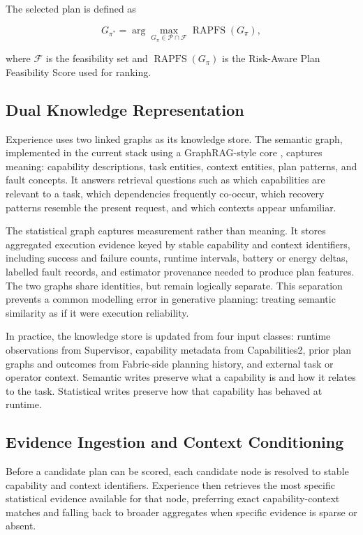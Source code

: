 \documentclass[letterpaper, 10pt, conference]{ieeeconf}
\begin{document}
The selected plan is defined as

\begin{equation}
G_{\pi^*}=\arg\max_{G_{\pi}\in \mathcal{P}\cap \mathcal{F}} \operatorname{RAPFS}(G_{\pi}),
\end{equation}

where $\mathcal{F}$ is the feasibility set and $\operatorname{RAPFS}(G_{\pi})$ is the Risk-Aware Plan Feasibility Score used for ranking.

\subsection{Dual Knowledge Representation}

Experience uses two linked graphs as its knowledge store. The semantic graph, implemented in the current stack using a GraphRAG-style core \cite{edge2025localglobalgraphrag}, captures meaning: capability descriptions, task entities, context entities, plan patterns, and fault concepts. It answers retrieval questions such as which capabilities are relevant to a task, which dependencies frequently co-occur, which recovery patterns resemble the present request, and which contexts appear unfamiliar.

The statistical graph captures measurement rather than meaning. It stores aggregated execution evidence keyed by stable capability and context identifiers, including success and failure counts, runtime intervals, battery or energy deltas, labelled fault records, and estimator provenance needed to produce plan features. The two graphs share identities, but remain logically separate. This separation prevents a common modelling error in generative planning: treating semantic similarity as if it were execution reliability.

In practice, the knowledge store is updated from four input classes: runtime observations from Supervisor, capability metadata from Capabilities2, prior plan graphs and outcomes from Fabric-side planning history, and external task or operator context. Semantic writes preserve what a capability is and how it relates to the task. Statistical writes preserve how that capability has behaved at runtime.

\subsection{Evidence Ingestion and Context Conditioning}

Before a candidate plan can be scored, each candidate node is resolved to stable capability and context identifiers. Experience then retrieves the most specific statistical evidence available for that node, preferring exact capability-context matches and falling back to broader aggregates when specific evidence is sparse or absent.
\end{document}
